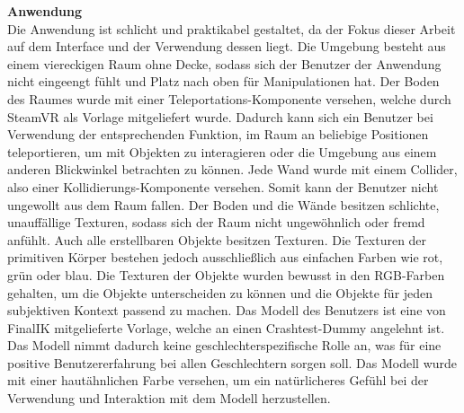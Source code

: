 \noindent \textbf{Anwendung}\\
Die Anwendung ist schlicht und praktikabel gestaltet, da der Fokus dieser Arbeit auf dem Interface und der Verwendung dessen liegt. Die Umgebung besteht aus einem viereckigen Raum ohne Decke, sodass sich der Benutzer der Anwendung nicht eingeengt fühlt und Platz nach oben für Manipulationen hat. Der Boden des Raumes wurde mit einer Teleportations-Komponente versehen, welche durch SteamVR als Vorlage mitgeliefert wurde. Dadurch kann sich ein Benutzer bei Verwendung der entsprechenden Funktion, im Raum an beliebige Positionen teleportieren, um mit Objekten zu interagieren oder die Umgebung aus einem anderen Blickwinkel betrachten zu können. Jede Wand wurde mit einem Collider, also einer Kollidierungs-Komponente versehen. Somit kann der Benutzer nicht ungewollt aus dem Raum fallen. Der Boden und die Wände besitzen schlichte, unauffällige Texturen, sodass sich der Raum nicht ungewöhnlich oder fremd anfühlt. Auch alle erstellbaren Objekte besitzen Texturen. Die Texturen der primitiven Körper bestehen jedoch ausschließlich aus einfachen Farben wie rot, grün oder blau. Die Texturen der Objekte wurden bewusst in den RGB-Farben gehalten, um die Objekte unterscheiden zu können und die Objekte für jeden subjektiven Kontext passend zu machen. Das Modell des Benutzers ist eine von FinalIK mitgelieferte Vorlage, welche an einen Crashtest-Dummy angelehnt ist. Das Modell nimmt dadurch keine geschlechterspezifische Rolle an, was für eine positive Benutzererfahrung bei allen Geschlechtern sorgen soll. Das Modell wurde mit einer hautähnlichen Farbe versehen, um ein natürlicheres Gefühl bei der Verwendung und Interaktion mit dem Modell herzustellen.\\

